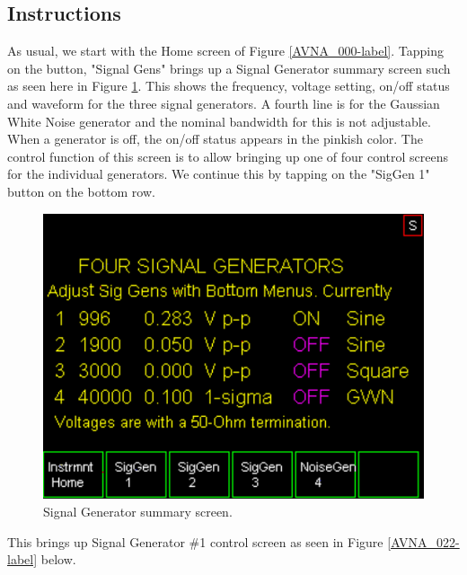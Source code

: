 \subsection{Instructions}
\label{subsect:ASGInstr}
As usual, we start with the Home screen of Figure  \ref{AVNA_000-label}.    Tapping on the button, "\textsf{Signal Gens}" brings up a Signal Generator summary screen such as seen here in Figure \ref{AVNA_021-label}.  This shows the frequency, voltage setting, on/off status and waveform for the three signal generators.  A fourth line is for the Gaussian White Noise generator and the nominal bandwidth for this is not adjustable.  When a generator is off, the on/off status appears in the pinkish color.  The control function of this screen is to allow bringing up one of four control screens for the individual generators.  We continue this by tapping on the "\textsf{SigGen 1}" button on the bottom row.
%
\begin{figure}[H]
\begin{center}
\includegraphics[scale=0.75]{./images/AVNA_021.pdf}
\caption{Signal Generator summary screen. }
\label{AVNA_021-label}
\end{center}
\end{figure}
%
This brings up Signal Generator \#1 control screen as seen in Figure  \ref{AVNA_022-label} below.
%
